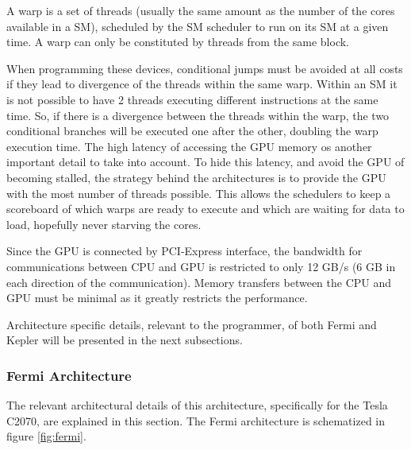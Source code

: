 A warp is a set of \cuda threads (usually the same amount as the number of the \cuda cores available in a SM), scheduled by the SM scheduler to run on its SM at a given time. A warp can only be constituted by \cuda threads from the same block.

When programming these devices, conditional jumps must be avoided at all costs if they lead to divergence of the \cuda threads within the same warp. Within an SM it is not possible to have 2 threads executing different instructions at the same time. So, if there is a divergence between the threads within the warp, the two conditional branches will be executed one after the other, doubling the warp execution time. The high latency of accessing the GPU memory os another important detail to take into account. To hide this latency, and avoid the GPU of becoming stalled, the strategy behind the \nvidia architectures is to provide the GPU with the most number of \cuda threads possible. This allows the schedulers to keep a scoreboard of which warps are ready to execute and which are waiting for data to load, hopefully never starving the \cuda cores.

Since the GPU is connected by PCI-Express interface, the bandwidth for communications between CPU and GPU is restricted to only 12 GB/s (6 GB in each direction of the communication). Memory transfers between the CPU and GPU must be minimal as it greatly restricts the performance.

Architecture specific details, relevant to the programmer, of both Fermi and Kepler will be presented in the next subsections.

\subsubsection{\nvidia Fermi Architecture}

The relevant architectural details of this architecture, specifically for the Tesla C2070, are explained in this section. The Fermi architecture is schematized in figure \ref{fig:fermi}.

